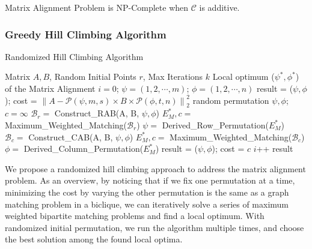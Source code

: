 \documentclass[conference]{IEEEtran}
\begin{document}
{\begin{theorem}
Matrix Alignment Problem is NP-Complete when $\mathcal{C}$ is additive.  
\end{theorem}




\subsubsection{Greedy Hill Climbing Algorithm}


\begin{algorithm}[b!] 
\caption{Randomized Hill Climbing Algorithm}
\label{alg:greedy_alignment}
\begin{algorithmic}[1]
\REQUIRE Matrix $A, B$, Random Initial Points $r$, Max Iterations $k$
\ENSURE Local optimum ($\psi^*, \phi^*$) of the Matrix Alignment
\STATE $i = 0$; $\psi=(1,2,\cdots,m)$; $\phi=(1,2,\cdots,n)$
\STATE result = ($\psi, \phi$); cost = $\left\|A-\mathcal{P}(\psi,m,s)\times B \times \mathcal{P}(\phi,t,n)\right\|_2^2$
  \STATE random permutation $\psi, \phi$; $c = \infty$
    \STATE $\mathcal{B}_r =$ Construct\_RAB(A, B, $\psi,\phi$)
    \STATE $E_M^*, c =$ Maximum\_Weighted\_Matching($\mathcal{B}_r$)
    \STATE $\psi =$ Derived\_Row\_Permutation($E_M^*$)
    \STATE $\mathcal{B}_c =$ Construct\_CAB(A, B, $\psi,\phi$)
    \STATE $E_M^*, c =$ Maximum\_Weighted\_Matching($\mathcal{B}_c$)
    \STATE $\phi =$ Derived\_Column\_Permutation($E_M^*$)
  \ENDFOR
  \STATE result = ($\psi, \phi$); cost = $c$
  \ENDIF
  \STATE $i$++
\ENDWHILE
\RETURN result
\end{algorithmic}
\end{algorithm}








We propose a randomized hill climbing approach to address the matrix alignment problem. As an overview, by noticing that if we fix one permutation at a time, minimizing the cost by varying the other permutation is the same as a graph matching problem in a biclique, we can iteratively solve a series of maximum weighted bipartite matching problems and find a local optimum. With randomized initial permutation, we run the algorithm multiple times, and choose the best solution among the found local optima. 


}
\end{document}
